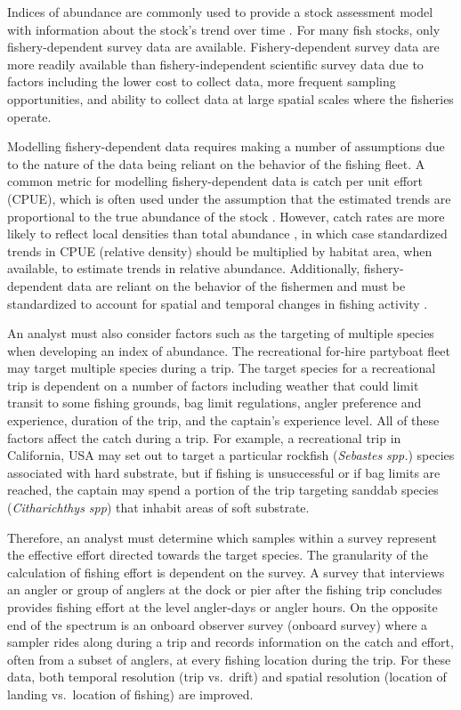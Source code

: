 \documentclass[
  12pt,
  authoryear,
  preprint,
  3p]{elsarticle}
\begin{document}
Indices of abundance are commonly used to provide a stock assessment
model with information about the stock's trend over time
\citep{Harley:2001:CUE, Hilborn:1992:QFS}. For many fish stocks, only
fishery-dependent survey data are available. Fishery-dependent survey
data are more readily available than fishery-independent scientific
survey data due to factors including the lower cost to collect data,
more frequent sampling opportunities, and ability to collect data at
large spatial scales where the fisheries operate.

Modelling fishery-dependent data requires making a number of assumptions
due to the nature of the data being reliant on the behavior of the
fishing fleet. A common metric for modelling fishery-dependent data is
catch per unit effort (CPUE), which is often used under the assumption
that the estimated trends are proportional to the true abundance of the
stock \citep{Maunder:2004:SCE}. However, catch rates are more likely to
reflect local densities than total abundance
\citep{Haggarty:2006:CIR, Schnute:1995:IEP}, in which case standardized
trends in CPUE (relative density) should be multiplied by habitat area,
when available, to estimate trends in relative abundance. Additionally,
fishery-dependent data are reliant on the behavior of the fishermen and
must be standardized to account for spatial and temporal changes in
fishing activity \citep{Campbell:2004:CSA, Hilborn:1992:QFS}.

An analyst must also consider factors such as the targeting of multiple
species when developing an index of abundance. The recreational for-hire
partyboat fleet may target multiple species during a trip. The target
species for a recreational trip is dependent on a number of factors
including weather that could limit transit to some fishing grounds, bag
limit regulations, angler preference and experience, duration of the
trip, and the captain's experience level. All of these factors affect
the catch during a trip. For example, a recreational trip in California,
USA may set out to target a particular rockfish (\emph{Sebastes spp.})
species associated with hard substrate, but if fishing is unsuccessful
or if bag limits are reached, the captain may spend a portion of the
trip targeting sanddab species (\emph{Citharichthys spp}) that inhabit
areas of soft substrate.

Therefore, an analyst must determine which samples within a survey
represent the effective effort directed towards the target species. The
granularity of the calculation of fishing effort is dependent on the
survey. A survey that interviews an angler or group of anglers at the
dock or pier after the fishing trip concludes provides fishing effort at
the level angler-days or angler hours. On the opposite end of the
spectrum is an onboard observer survey (onboard survey) where a sampler
rides along during a trip and records information on the catch and
effort, often from a subset of anglers, at every fishing location during
the trip. For these data, both temporal resolution (trip vs.~drift) and
spatial resolution (location of landing vs.~location of fishing) are
improved.
\end{document}
